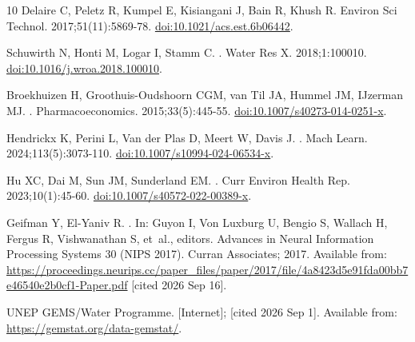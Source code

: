 \documentclass[10pt,letterpaper]{article}
\begin{document}
\begin{thebibliography}{10}
{Delaire} C, {Peletz} R, {Kumpel} E, {Kisiangani} J, {Bain} R, {Khush} R.
\newblock Environ Sci Technol. 2017;51(11):5869-78.
\newblock \href {http://dx.doi.org/10.1021/acs.est.6b06442}
  {doi:10.1021/acs.est.6b06442}.

{Schuwirth} N, {Honti} M, {Logar} I, {Stamm} C.
.
\newblock Water Res X. 2018;1:100010.
\newblock \href {http://dx.doi.org/10.1016/j.wroa.2018.100010}
  {doi:10.1016/j.wroa.2018.100010}.

{Broekhuizen} H, {Groothuis-Oudshoorn} CGM, {van Til} JA, {Hummel} JM,
  {IJzerman} MJ.
.
\newblock Pharmacoeconomics. 2015;33(5):445-55.
\newblock \href {http://dx.doi.org/10.1007/s40273-014-0251-x}
  {doi:10.1007/s40273-014-0251-x}.

{Hendrickx} K, {Perini} L, {Van der Plas} D, {Meert} W, {Davis} J.
.
\newblock Mach Learn. 2024;113(5):3073-110.
\newblock \href {http://dx.doi.org/10.1007/s10994-024-06534-x}
  {doi:10.1007/s10994-024-06534-x}.

{Hu} XC, {Dai} M, {Sun} JM, {Sunderland} EM.
.
\newblock Curr Environ Health Rep. 2023;10(1):45-60.
\newblock \href {http://dx.doi.org/10.1007/s40572-022-00389-x}
  {doi:10.1007/s40572-022-00389-x}.

{Geifman} Y, {El-Yaniv} R.
.
\newblock In: {Guyon} I, {Von Luxburg} U, {Bengio} S, {Wallach} H, {Fergus} R,
  {Vishwanathan} S, et~al., editors. Advances in Neural Information Processing
  Systems 30 (NIPS 2017). Curran Associates; 2017. Available from:
  \url{https://proceedings.neurips.cc/paper_files/paper/2017/file/4a8423d5e91fda00bb7e46540e2b0cf1-Paper.pdf}
  [cited 2026 Sep 16].

{UNEP GEMS/Water Programme}.
 [Internet]; [cited 2026 Sep 1].
\newblock Available from: \url{https://gemstat.org/data-gemstat/}.


\end{thebibliography}
\end{document}
